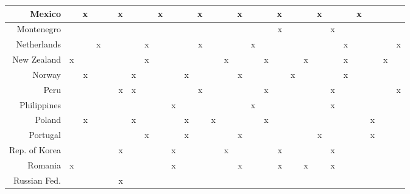 {\begin{longtable}{|r|r|r|r|r|r|r|r|r|r|r|r|r|r|r|r|r|r|r|r|r|r|r|r|r|r|r|}
Mexico &     &    x &     &     &    x &     &     &    x &     &     &    x &     &     &    x &     &     &    x &     &     &    x &     &     &    x &     &     &     \\ \midrule
Montenegro &     &     &     &     &     &     &     &     &     &     &     &     &     &     &     &     &    x &     &     &     &    x &     &     &     &     &     \\ \midrule
Netherlands &     &     &    x &     &     &     &    x &     &     &     &    x &     &     &     &    x &     &     &     &     &     &     &    x &     &     &     &    x \\ \midrule
New Zealand &    x &     &     &     &     &     &    x &     &     &     &     &     &    x &     &     &    x &     &     &    x &     &     &    x &     &     &    x &     \\ \midrule
Norway &     &    x &     &     &     &    x &     &     &     &    x &     &     &     &    x &     &     &     &    x &     &     &     &    x &     &     &     &     \\ \midrule
Peru &     &     &     &     &    x &    x &     &     &     &     &    x &     &     &     &     &    x &     &     &     &     &    x &     &     &     &     &    x \\ \midrule
Philippines &     &     &     &     &     &     &     &     &    x &     &     &     &     &     &    x &     &     &     &     &     &    x &     &     &     &     &     \\ \midrule
Poland &     &    x &     &     &     &    x &     &     &     &    x &     &    x &     &     &     &    x &     &     &     &     &     &     &     &    x &     &     \\ \midrule
Portugal &     &     &     &     &     &     &    x &     &     &    x &     &     &     &    x &     &     &     &     &     &    x &     &     &     &    x &     &     \\ \midrule
Rep. of Korea &     &     &     &     &    x &     &     &     &    x &     &     &     &    x &     &     &     &    x &     &     &     &    x &     &     &     &     &     \\ \midrule
Romania &    x &     &     &     &     &     &     &     &    x &     &     &     &     &    x &     &     &    x &     &    x &     &    x &     &     &     &     &     \\\midrule
Russian Fed. &     &     &     &      &    x &     &     &     &      &     &     &     &     &     &     &     &     &     &     &     &     &     &     &     &     &     \\ \midrule

\end{longtable}}
